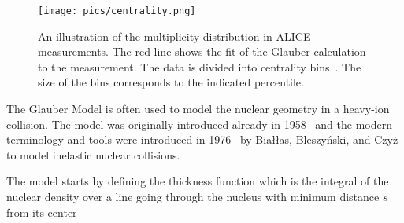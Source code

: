 \begin{figure}[htb]
\centering

               \texttt{[image: pics/centrality.png]}
        \caption[An illustration of the multiplicity distribution in ALICE measurement with centrality classes.]{An illustration of the multiplicity distribution in ALICE measurements. The red line shows
the fit of the Glauber calculation to the measurement. The data is divided into centrality bins~\cite{PhysRevC.88.044909}. The size of the bins corresponds to the indicated percentile.}
        	\label{fig:centrality}
\end{figure}





The Glauber Model is often used to model the nuclear geometry in a heavy-ion collision. The model was originally introduced already in 1958~\cite{Glauber:1959} and the modern terminology and tools were introduced in 1976~\cite{Biallas1976461} by Białłas, Bleszyński, and Czyż to model inelastic nuclear collisions.

The model starts by defining the thickness function which is the integral of the nuclear density over a line going through the nucleus with minimum distance $s$ from its center

